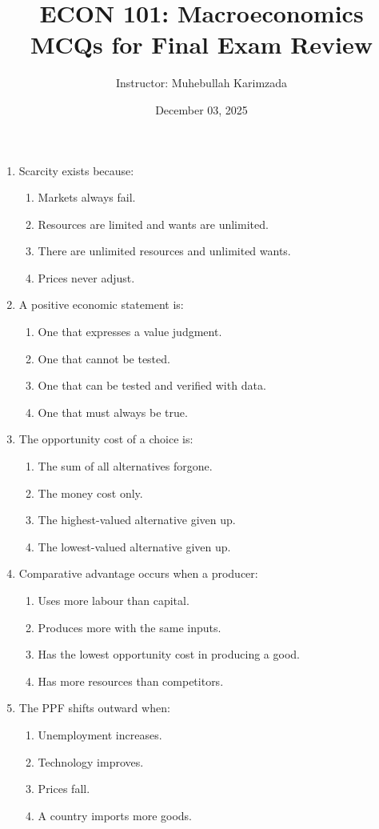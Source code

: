 \documentclass[12pt]{article}
\title{ECON 101: Macroeconomics \vspace{10pt}\\ MCQs for Final Exam Review}
\author{Instructor: Muhebullah Karimzada}
\date{December 03,  2025}
\begin{document}
\maketitle

\begin{enumerate}[label=\textbf{\arabic*.}]

\item Scarcity exists because:
\begin{enumerate}[label=(\Alph*)]
    \item Markets always fail.
    \item Resources are limited and wants are unlimited.
    \item There are unlimited resources and unlimited wants.
    \item Prices never adjust.
\end{enumerate}

\item A positive economic statement is:
\begin{enumerate}[label=(\Alph*)]
    \item One that expresses a value judgment.
    \item One that cannot be tested.
    \item One that can be tested and verified with data.
    \item One that must always be true.
\end{enumerate}

\item The opportunity cost of a choice is:
\begin{enumerate}[label=(\Alph*)]
    \item The sum of all alternatives forgone.
    \item The money cost only.
    \item The highest-valued alternative given up.
    \item The lowest-valued alternative given up.
\end{enumerate}

\item Comparative advantage occurs when a producer:
\begin{enumerate}[label=(\Alph*)]
    \item Uses more labour than capital.
    \item Produces more with the same inputs.
    \item Has the lowest opportunity cost in producing a good.
    \item Has more resources than competitors.
\end{enumerate}
\newpage
\item The PPF shifts outward when:
\begin{enumerate}[label=(\Alph*)]
    \item Unemployment increases.
    \item Technology improves.
    \item Prices fall.
    \item A country imports more goods.
\end{enumerate}


\end{enumerate}
\end{document}
